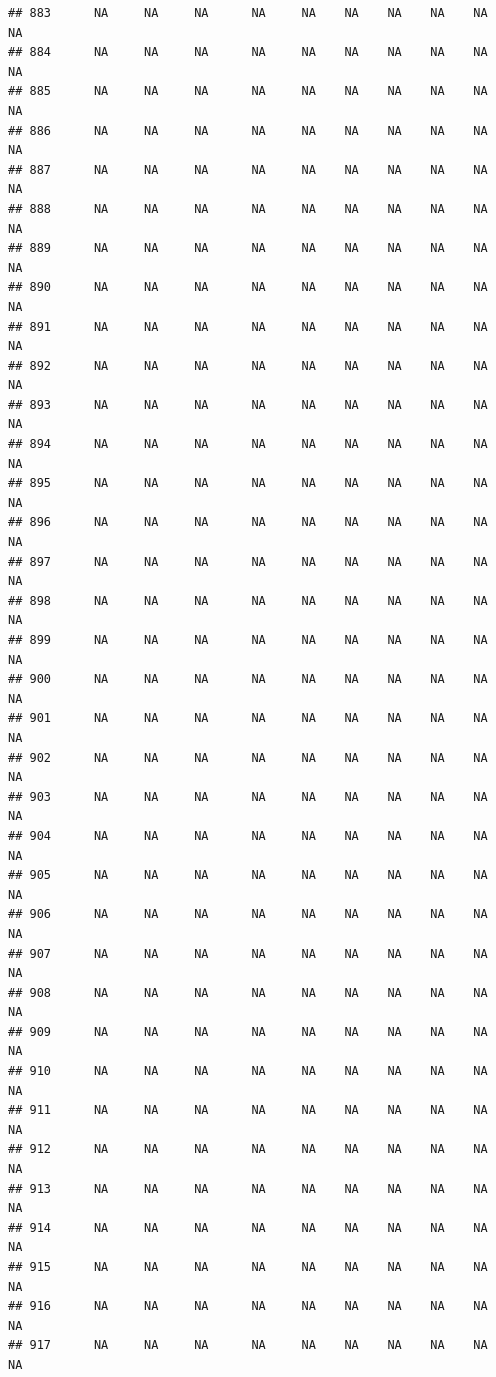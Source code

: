 \documentclass{article}\usepackage{graphicx, color}
\makeatletter
\newenvironment{kframe}{%
 \def\at@end@of@kframe{}%
 \ifinner\ifhmode%
  \def\at@end@of@kframe{\end{minipage}}%
  \begin{minipage}{\columnwidth}%
 \fi\fi%
 \def\FrameCommand##1{\hskip\@totalleftmargin \hskip-\fboxsep
 \colorbox{shadecolor}{##1}\hskip-\fboxsep
     \hskip-\linewidth \hskip-\@totalleftmargin \hskip\columnwidth}%
 \MakeFramed {\advance\hsize-\width
   \@totalleftmargin\z@ \linewidth\hsize
   \@setminipage}}%
 {\par\unskip\endMakeFramed%
 \at@end@of@kframe}
\newenvironment{knitrout}{}{} %
\makeatother
\begin{document}
\begin{knitrout}
\begin{kframe}
\begin{verbatim}
## 883      NA     NA     NA      NA     NA    NA    NA    NA    NA     NA
## 884      NA     NA     NA      NA     NA    NA    NA    NA    NA     NA
## 885      NA     NA     NA      NA     NA    NA    NA    NA    NA     NA
## 886      NA     NA     NA      NA     NA    NA    NA    NA    NA     NA
## 887      NA     NA     NA      NA     NA    NA    NA    NA    NA     NA
## 888      NA     NA     NA      NA     NA    NA    NA    NA    NA     NA
## 889      NA     NA     NA      NA     NA    NA    NA    NA    NA     NA
## 890      NA     NA     NA      NA     NA    NA    NA    NA    NA     NA
## 891      NA     NA     NA      NA     NA    NA    NA    NA    NA     NA
## 892      NA     NA     NA      NA     NA    NA    NA    NA    NA     NA
## 893      NA     NA     NA      NA     NA    NA    NA    NA    NA     NA
## 894      NA     NA     NA      NA     NA    NA    NA    NA    NA     NA
## 895      NA     NA     NA      NA     NA    NA    NA    NA    NA     NA
## 896      NA     NA     NA      NA     NA    NA    NA    NA    NA     NA
## 897      NA     NA     NA      NA     NA    NA    NA    NA    NA     NA
## 898      NA     NA     NA      NA     NA    NA    NA    NA    NA     NA
## 899      NA     NA     NA      NA     NA    NA    NA    NA    NA     NA
## 900      NA     NA     NA      NA     NA    NA    NA    NA    NA     NA
## 901      NA     NA     NA      NA     NA    NA    NA    NA    NA     NA
## 902      NA     NA     NA      NA     NA    NA    NA    NA    NA     NA
## 903      NA     NA     NA      NA     NA    NA    NA    NA    NA     NA
## 904      NA     NA     NA      NA     NA    NA    NA    NA    NA     NA
## 905      NA     NA     NA      NA     NA    NA    NA    NA    NA     NA
## 906      NA     NA     NA      NA     NA    NA    NA    NA    NA     NA
## 907      NA     NA     NA      NA     NA    NA    NA    NA    NA     NA
## 908      NA     NA     NA      NA     NA    NA    NA    NA    NA     NA
## 909      NA     NA     NA      NA     NA    NA    NA    NA    NA     NA
## 910      NA     NA     NA      NA     NA    NA    NA    NA    NA     NA
## 911      NA     NA     NA      NA     NA    NA    NA    NA    NA     NA
## 912      NA     NA     NA      NA     NA    NA    NA    NA    NA     NA
## 913      NA     NA     NA      NA     NA    NA    NA    NA    NA     NA
## 914      NA     NA     NA      NA     NA    NA    NA    NA    NA     NA
## 915      NA     NA     NA      NA     NA    NA    NA    NA    NA     NA
## 916      NA     NA     NA      NA     NA    NA    NA    NA    NA     NA
## 917      NA     NA     NA      NA     NA    NA    NA    NA    NA     NA

\end{verbatim}
\end{kframe}
\end{knitrout}
\end{document}
